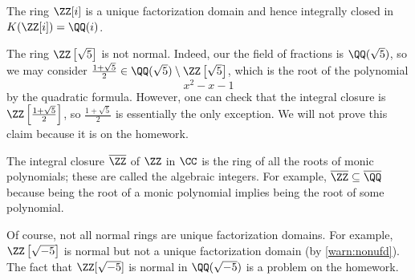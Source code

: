 \begin{example}
	The ring $\ZZ[i]$ is a unique factorization domain and hence integrally closed in $K(\ZZ[i])=\QQ(i)$.
\end{example}
\begin{nex} \label{nex:zrootfivenotnormal}
	The ring $\ZZ\left[\sqrt5\right]$ is not normal. Indeed, our the field of fractions is $\QQ(\sqrt5)$, so we may consider $\frac{1+\sqrt5}2\in\QQ(\sqrt5)\setminus\ZZ\left[\sqrt5\right]$, which is the root of the polynomial
	\[x^2-x-1\]
	by the quadratic formula. However, one can check that the integral closure is $\ZZ\left[\frac{1+\sqrt5}2\right]$, so $\frac{1+\sqrt5}2$ is essentially the only exception. We will not prove this claim because it is on the homework.
\end{nex}
\begin{example}
	The integral closure $\overline\ZZ$ of $\ZZ$ in $\CC$ is the ring of all the roots of monic polynomials; these are called the algebraic integers. For example, $\overline\ZZ\subseteq\overline\QQ$ because being the root of a monic polynomial implies being the root of some polynomial.
\end{example}
\begin{remark}
	Of course, not all normal rings are unique factorization domains. For example, $\ZZ\left[\sqrt{-5}\right]$ is normal but not a unique factorization domain (by \autoref{warn:nonufd}). The fact that $\ZZ[\sqrt{-5}]$ is normal in $\QQ(\sqrt{-5})$ is a problem on the homework.
\end{remark}

